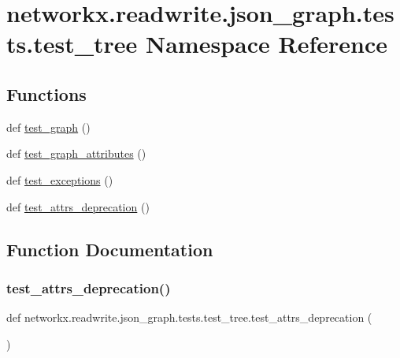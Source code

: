 \hypertarget{namespacenetworkx_1_1readwrite_1_1json__graph_1_1tests_1_1test__tree}{}\section{networkx.\+readwrite.\+json\+\_\+graph.\+tests.\+test\+\_\+tree Namespace Reference}
\label{namespacenetworkx_1_1readwrite_1_1json__graph_1_1tests_1_1test__tree}
\subsection*{Functions}
\begin{DoxyCompactItemize}
\item 
def \hyperlink{namespacenetworkx_1_1readwrite_1_1json__graph_1_1tests_1_1test__tree_a4a6700a50a701bc0e8c03258256da4f8}{test\+\_\+graph} ()
\item 
def \hyperlink{namespacenetworkx_1_1readwrite_1_1json__graph_1_1tests_1_1test__tree_aea5d4129298eb1e0fb2d690855a227e6}{test\+\_\+graph\+\_\+attributes} ()
\item 
def \hyperlink{namespacenetworkx_1_1readwrite_1_1json__graph_1_1tests_1_1test__tree_a4ec40d30108c19d6f2719fba867dd5fd}{test\+\_\+exceptions} ()
\item 
def \hyperlink{namespacenetworkx_1_1readwrite_1_1json__graph_1_1tests_1_1test__tree_a0485e313a4d1e8849f1325496bdfd34b}{test\+\_\+attrs\+\_\+deprecation} ()
\end{DoxyCompactItemize}


\subsection{Function Documentation}
\mbox{\label{namespacenetworkx_1_1readwrite_1_1json__graph_1_1tests_1_1test__tree_a0485e313a4d1e8849f1325496bdfd34b}} 
\subsubsection{\texorpdfstring{test\+\_\+attrs\+\_\+deprecation()}{test\_attrs\_deprecation()}}
{\footnotesize\ttfamily def networkx.\+readwrite.\+json\+\_\+graph.\+tests.\+test\+\_\+tree.\+test\+\_\+attrs\+\_\+deprecation (\begin{DoxyParamCaption}{ }\end{DoxyParamCaption})}

